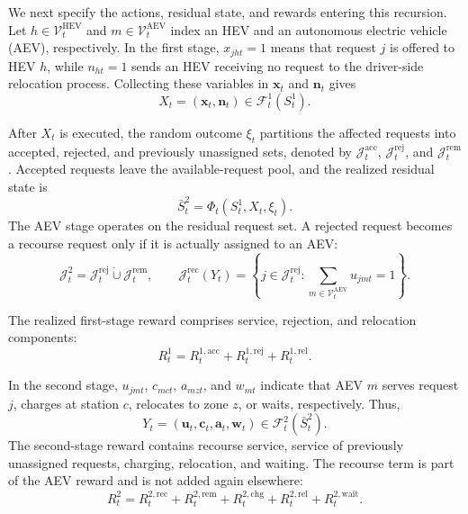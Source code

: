 We next specify the actions, residual state, and rewards entering this recursion. Let $h\in\mathcal V_t^{\mathrm{HEV}}$ and $m\in\mathcal V_t^{\mathrm{AEV}}$ index an HEV and an autonomous electric vehicle (AEV), respectively. In the first stage, $x_{jht}=1$ means that request $j$ is offered to HEV $h$, while $n_{ht}=1$ sends an HEV receiving no request to the driver-side relocation process. Collecting these variables in $\boldsymbol x_t$ and $\boldsymbol n_t$ gives
\begin{equation}X_t=(\boldsymbol x_t,\boldsymbol n_t)\in\mathcal F_t^1(S_t^1).\label{eq:recourse_stage1_action}\end{equation}

After $X_t$ is executed, the random outcome $\xi_t$ partitions the affected requests into accepted, rejected, and previously unassigned sets, denoted by $\mathcal J_t^{\mathrm{acc}}$, $\mathcal J_t^{\mathrm{rej}}$, and $\mathcal J_t^{\mathrm{rem}}$. Accepted requests leave the available-request pool, and the realized residual state is
\begin{equation}\bar S_t^2=\Phi_t(S_t^1,X_t,\xi_t).\label{eq:recourse_residual_state}\end{equation}
The AEV stage operates on the residual request set. A rejected request becomes a recourse request only if it is actually assigned to an AEV:
\begin{equation}\mathcal J_t^2=\mathcal J_t^{\mathrm{rej}}\mathbin{\dot\cup}\mathcal J_t^{\mathrm{rem}},\qquad \mathcal J_t^{\mathrm{rec}}(Y_t)=\left\{j\in\mathcal J_t^{\mathrm{rej}}:\sum_{m\in\mathcal V_t^{\mathrm{AEV}}}u_{jmt}=1\right\}.\label{eq:recourse_request_sets}\end{equation}

The realized first-stage reward comprises service, rejection, and relocation components:
\begin{equation}R_t^1=R_t^{1,\mathrm{acc}}+R_t^{1,\mathrm{rej}}+R_t^{1,\mathrm{rel}}.\label{eq:recourse_stage1_reward}\end{equation}

In the second stage, $u_{jmt}$, $c_{mct}$, $a_{mzt}$, and $w_{mt}$ indicate that AEV $m$ serves request $j$, charges at station $c$, relocates to zone $z$, or waits, respectively. Thus,
\begin{equation}Y_t=(\boldsymbol u_t,\boldsymbol c_t,\boldsymbol a_t,\boldsymbol w_t)\in\mathcal F_t^2(\bar S_t^2).\label{eq:recourse_stage2_action}\end{equation}
The second-stage reward contains recourse service, service of previously unassigned requests, charging, relocation, and waiting. The recourse term is part of the AEV reward and is not added again elsewhere:
\begin{equation}R_t^2=R_t^{2,\mathrm{rec}}+R_t^{2,\mathrm{rem}}+R_t^{2,\mathrm{chg}}+R_t^{2,\mathrm{rel}}+R_t^{2,\mathrm{wait}}.\label{eq:recourse_stage2_reward}\end{equation}

